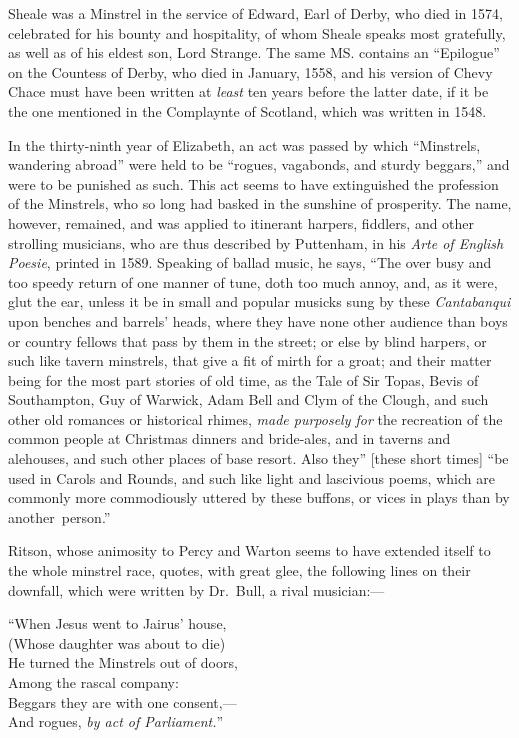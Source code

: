 \renewcommand\versoheader{richard sheale.---extinction of minstrelsy.}


Sheale was a Minstrel in the service of Edward, Earl of Derby, who died in
1574, celebrated for his bounty and hospitality, of whom Sheale speaks most
gratefully, as well as of his eldest son, Lord Strange. The same MS. contains an
“Epilogue” on the Countess of Derby, who died in January, 1558, and his
version of Chevy Chace must have been written at \textit{least} ten years before the
latter date, if it be the one mentioned in the Complaynte of Scotland, which was
written in 1548.

In the thirty-ninth year of Elizabeth, an act was passed by which “Minstrels,
wandering abroad” were held to be “rogues, vagabonds, and sturdy beggars,”
and were to be punished as such. This act seems to have extinguished the profession
of the Minstrels, who so long had basked in the sunshine of prosperity.
The name, however, remained, and was applied to itinerant harpers, fiddlers,
and other strolling musicians, who are thus described by Puttenham, in his \textit{Arte
of English Poesie}, printed in 1589. Speaking of ballad music, he says, “The
over busy and too speedy return of one manner of tune, doth too much annoy,
and, as it were, glut the ear, unless it be in small and popular musicks sung by
these \textit{Cantabanqui} upon benches and barrels’ heads, where they have none other
audience than boys or country fellows that pass by them in the street; or else by
blind harpers, or such like tavern minstrels, that give a fit of mirth for a groat;
and their matter being for the most part stories of old time, as the Tale of Sir
Topas, Bevis of Southampton, Guy of Warwick, Adam Bell and Clym of the
Clough, and such other old romances or historical rhimes, \textit{made purposely for} the
recreation of the common people at Christmas dinners and bride-ales, and in
taverns and alehouses, and such other places of base resort. Also they” [these
short times] “be used in Carols and Rounds, and such like light and lascivious
poems, which are commonly more commodiously uttered by these buffons, or vices
in plays than by another~person.”

Ritson, whose animosity to Percy and Warton seems to have extended itself
to the whole minstrel race, quotes, with great glee, the following lines on their
downfall, which were written by Dr.~Bull, a rival musician:—

\settowidth{\versewidth}{He turned the Minstrels out of doors,}
\begin{scverse}
“When Jesus went to Jairus’ house,\\
(Whose daughter was about to die)\\
He turned the Minstrels out of doors,\\
Among the rascal company:\\
Beggars they are with one consent,—\\
And rogues, \textit{by act of Parliament.}” 
\end{scverse}

\centerrule
\pagebreak